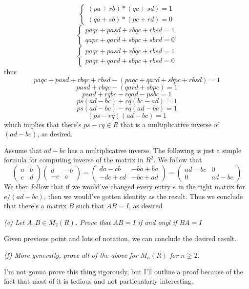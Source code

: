 \documentclass[11pt,oneside,titlepage]{book}
\begin{document}
$$
\begin{cases}
  (pa + rb) * (qc + sd) = 1  \\
  (qa + sb) * (pc + rd) = 0
\end{cases}
$$
$$
\begin{cases}
  paqc + pasd + rbqc + rbsd = 1 \\
  qapc + qard + sbpc + sbrd = 0
\end{cases}
$$
$$
\begin{cases}
  paqc + pasd + rbqc + rbsd = 1 \\
  paqc + qard + sbpc + rbsd = 0
\end{cases}
$$
thus
$$ paqc + pasd + rbqc + rbsd -   (paqc + qard + sbpc + rbsd) = 1 $$
$$ pasd + rbqc - (qard + sbpc) = 1 $$
$$ psad + rqbc - rqad - psbc = 1 $$
$$ ps(ad - bc) + rq(bc - ad) = 1 $$
$$ ps(ad - bc) - rq(ad - bc) = 1 $$
$$ (ps - rq) (ad - bc) = 1 $$
which implies that there's $ps - rq \in R$ that is a multiplicative
inverse of $(ad - bc)$, as desired.

Assume that $ad - bc$ has a multiplicative inverse. The following is
just a simple formula for computing inverse of the matrix in $R^2$. We
follow that
$$
\begin{pmatrix}
  a & b \\
  c & d
\end{pmatrix}
\begin{pmatrix}
  d & -b \\
  -c & a
\end{pmatrix} =
\begin{pmatrix}
  da - cb & -ba + ba \\
  -dc + cd & -bc + ad 
\end{pmatrix} =
\begin{pmatrix}
  ad - bc & 0 \\
  0 & ad - bc 
\end{pmatrix}
$$
We then follow that if we would've changed every entry $e$ in the
right matrix for $e / (ad - bc)$, then we would've gotten identity as
the result. Thus we conclude that there's a matrix $B$ such that
$AB = I$, as desired

\textit{(e) Let $A, B \in M_2(R)$. Prove that $AB = I$ if and onyl if $BA = I$}

Given previous point and lots of notation, we can conclude the desired result.

\textit{(f) More generally, prove all of the above for $M_n(R)$ for $n \geq 2$.}

I'm not gonna prove this thing rigorously, but I'll outline a proof
because of the fact that most of it is tedious and not particualarly
interesting.
\end{document}
